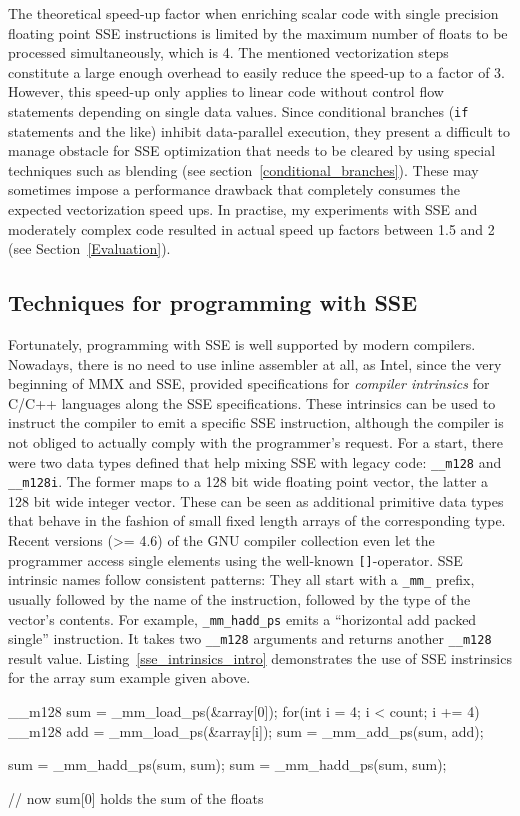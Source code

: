 The theoretical speed-up factor when enriching scalar code with single precision floating point SSE instructions is limited by the maximum number of floats to be processed simultaneously, which is 4. The mentioned vectorization steps constitute a large enough overhead to easily reduce the speed-up to a factor of 3. However, this speed-up only applies to linear code without control flow statements depending on single data values. Since conditional branches (\texttt{if} statements and the like) inhibit data-parallel execution, they present a difficult to manage obstacle for SSE optimization that needs to be cleared by using special techniques such as blending (see section~\ref{conditional_branches}). These may sometimes impose a performance drawback that completely consumes the expected vectorization speed ups. In practise, my experiments with SSE and moderately complex code resulted in actual speed up factors between 1.5 and 2 (see Section~\ref{Evaluation}).

\subsection{Techniques for programming with SSE}
Fortunately, programming with SSE is well supported by modern compilers. Nowadays, there is no need to use inline assembler at all, as Intel, since the very beginning of MMX and SSE, provided specifications for \emph{compiler intrinsics} for C/C++ languages along the SSE specifications. These intrinsics can be used to instruct the compiler to emit a specific SSE instruction, although the compiler is not obliged to actually comply with the programmer's request. For a start, there were two data types defined that help mixing SSE with legacy code: \texttt{\_\_m128} and \texttt{\_\_m128i}. The former maps to a 128 bit wide floating point vector, the latter a 128 bit wide integer vector. These can be seen as additional primitive data types that behave in the fashion of small fixed length arrays of the corresponding type. Recent versions (>= 4.6) of the GNU compiler collection even let the programmer access single elements using the well-known \texttt{[]}-operator. SSE intrinsic names follow consistent patterns: They all start with a \texttt{\_mm\_} prefix, usually followed by the name of the instruction, followed by the type of the vector's contents. For example, \texttt{\_mm\_hadd\_ps} emits a ``horizontal add packed single'' instruction. It takes two \texttt{\_\_m128} arguments and returns another \texttt{\_\_m128} result value. Listing~\ref{sse_intrinsics_intro} demonstrates the use of SSE instrinsics for the array sum example given above.
\begin{code}[caption={Array sum using SSE instrinsics}, label=sse_intrinsics_intro]
  __m128 sum = _mm_load_ps(&array[0]);
  for(int i = 4; i < count; i += 4) {
    __m128 add = _mm_load_ps(&array[i]);
    sum = _mm_add_ps(sum, add);
  }

  sum = _mm_hadd_ps(sum, sum);
  sum = _mm_hadd_ps(sum, sum);

  // now sum[0] holds the sum of the floats
\end{code}

